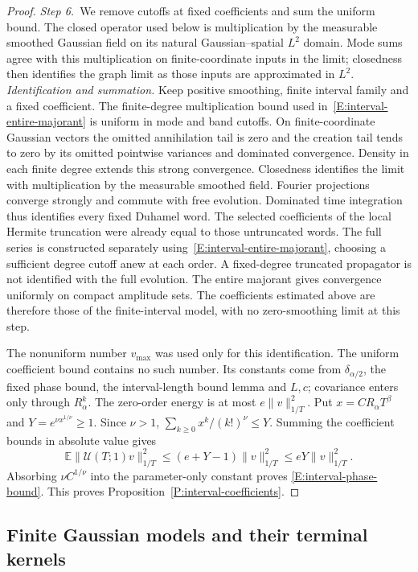 \documentclass[12pt,oneside,openany]{book}
\numberwithin{equation}{section}
\theoremstyle{nogostyle}
\theoremstyle{definition}
\newcommand{\E}{\mathbb{E}}
\begin{document}
\begin{proof}
  \medskip
  \noindent\textit{Step 6.~}We remove cutoffs at fixed coefficients and sum
  the uniform bound.
  The closed operator used below is multiplication by the measurable smoothed
  Gaussian field on its natural Gaussian--spatial $L^2$ domain. Mode sums
  agree with this multiplication on finite-coordinate inputs in the limit;
  closedness then identifies the graph limit as those inputs are approximated
  in $L^2$.
  \emph{Identification and summation.} Keep positive smoothing, finite interval
  family and a fixed coefficient. The finite-degree multiplication bound used
  in~\eqref{E:interval-entire-majorant} is uniform in mode and band cutoffs. On
  finite-coordinate Gaussian vectors the omitted annihilation tail is zero and
  the creation tail tends to zero by its omitted pointwise variances and
  dominated convergence. Density in each finite degree extends this strong
  convergence. Closedness identifies the limit with multiplication by the
  measurable smoothed field. Fourier projections converge strongly and commute
  with free evolution. Dominated time integration thus identifies every fixed
  Duhamel word. The selected coefficients of the local Hermite truncation were
  already equal to those untruncated words. The full series is constructed
  separately using~\eqref{E:interval-entire-majorant}, choosing a sufficient
  degree cutoff anew at each order. A fixed-degree truncated propagator is not
  identified with the full evolution. The entire majorant gives convergence
  uniformly on compact amplitude sets. The coefficients estimated above are
  therefore those of the finite-interval model, with no zero-smoothing limit at
  this step.

  The nonuniform number $v_{\max}$ was used only for this identification. The
  uniform coefficient bound contains no such number. Its constants come from
  $\delta_{\alpha/2}$, the fixed phase bound, the interval-length bound lemma
  and $L,c$; covariance enters only through $R_\alpha^k$. The zero-order energy
  is at most $e\|v\|_{1/T}^2$. Put $x = CR_\alpha T^\beta$ and $Y = e^{\nu
  x^{1/\nu}} \ge 1$. Since $\nu > 1$, $\sum_{k\ge0}x^k/(k!)^\nu \le Y$. Summing
  the coefficient bounds in absolute value gives
  \[
    \E\|\mathcal{U}(T;1)v\|_{1/T}^2
    \le(e+Y-1)\|v\|_{1/T}^2\le eY\|v\|_{1/T}^2.
  \]
  Absorbing $\nu C^{1/\nu}$ into the parameter-only constant proves
  \eqref{E:interval-phase-bound}. This proves
  Proposition~\ref{P:interval-coefficients}.
\end{proof}

\subsection{Finite Gaussian models and their terminal kernels}
\end{document}
